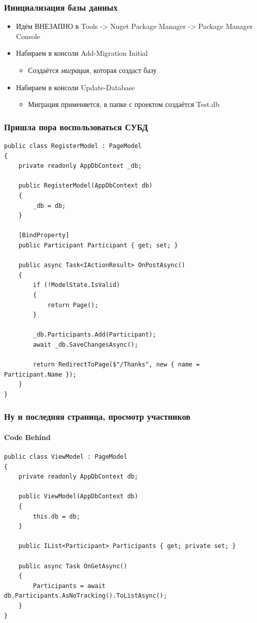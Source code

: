 \documentclass[xetex,mathserif,serif]{beamer}
\begin{document}
	\begin{frame}
		\frametitle{Инициализация базы данных}
		\begin{itemize}
			\item Идём ВНЕЗАПНО в Tools -> Nuget Package Manager -> Package Manager Console
			\item Набираем в консоли Add-Migration Initial
			\begin{itemize}
				\item Создаётся \textit{миграция}, которая создаст базу
			\end{itemize}
			\item Набираем в консоли Update-Database
			\begin{itemize}
				\item Миграция применяется, в папке с проектом создаётся Test.db
			\end{itemize}
		\end{itemize}
	\end{frame}

	\begin{frame}[fragile]
		\frametitle{Пришла пора воспользоваться СУБД}
		\begin{tiny}
			\begin{verbatim}
public class RegisterModel : PageModel
{
    private readonly AppDbContext _db;

    public RegisterModel(AppDbContext db)
    {
        _db = db;
    }

    [BindProperty]
    public Participant Participant { get; set; }

    public async Task<IActionResult> OnPostAsync()
    {
        if (!ModelState.IsValid)
        {
            return Page();
        }

        _db.Participants.Add(Participant);
        await _db.SaveChangesAsync();

        return RedirectToPage($"/Thanks", new { name = Participant.Name });
    }
}
			\end{verbatim}
		\end{tiny}
	\end{frame}

	\begin{frame}[fragile]
		\frametitle{Ну и последняя страница, просмотр участников}
		\framesubtitle{Code Behind}
		\begin{tiny}
			\begin{verbatim}
public class ViewModel : PageModel
{
    private readonly AppDbContext db;

    public ViewModel(AppDbContext db)
    {
        this.db = db;
    }

    public IList<Participant> Participants { get; private set; }

    public async Task OnGetAsync()
    {
        Participants = await db.Participants.AsNoTracking().ToListAsync();
    }
}
			\end{verbatim}
		\end{tiny}
	\end{frame}
\end{document}
